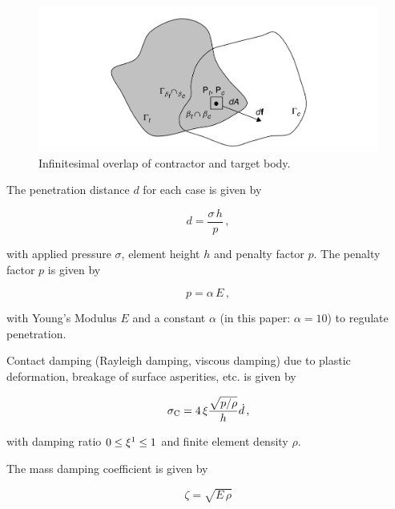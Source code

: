 \begin{figure}[!htbp]
    \centering
    \includegraphics[width=\columnwidth]{Contact}
    \caption{Infinitesimal overlap of contractor and target body. \cite{Mun04}}
    \label{fig:contact}
\end{figure}

\bigbreak
The penetration distance $d$ for each case is given by \cite{Mun04}

\begin{equation}
    \label{eq:d}
    d=\frac{\sigma\,h}{p}\,,
\end{equation}

with applied pressure $\sigma$, element height $h$ and penalty factor $p$. 
\bigbreak
The penalty factor $p$ is given by

\begin{equation}
    \label{eq:p}
    p=\alpha\,E\,,
\end{equation}

with \rm{Young's Modulus} $E$ and a constant $\alpha$ (in this paper: $\alpha=10$) to regulate penetration. 

\bigbreak
Contact damping (Rayleigh damping, viscous damping) due to plastic deformation, breakage of surface asperities, etc. is given by \cite{Mun04}

\begin{equation}
    \label{eq:sigmac}
    \sigma_{\rm{C}}=4\,\xi\frac{\sqrt{p/\rho}}{h}\dot{d}\,,
\end{equation}

\addtocounter{footnote}{-1}
with damping ratio $0\leq\xi\footnotemark\leq1$ and finite element density $\rho$.  


\bigbreak
The mass damping coefficient is given by

\begin{equation}
    \label{eq:massdamp}
    \zeta = \sqrt{E\,\rho}
\end{equation}